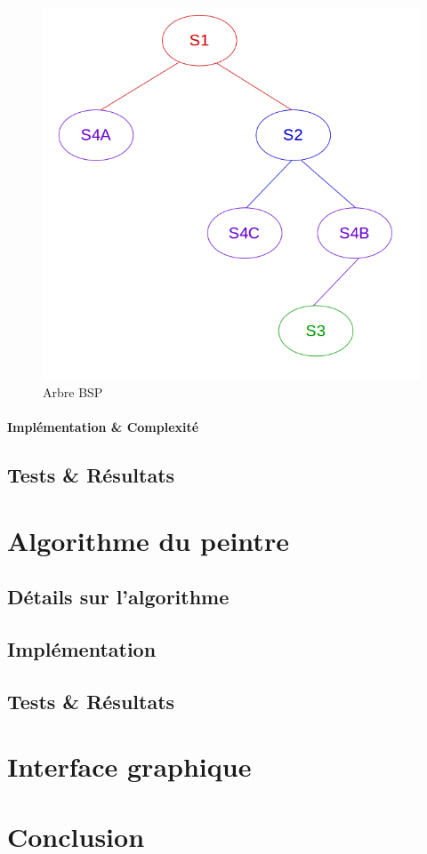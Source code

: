 \documentclass[11pt,a4paper]{article}
\begin{document}
\begin{figure}[!h]
\centering
\includegraphics[scale=0.4]{free_splits_3.png}
\caption{Arbre BSP}
\label{split_bsp}
\end{figure}

\paragraph{Implémentation \& Complexité}

\subsection{Tests \& Résultats}

\section{Algorithme du peintre}

\subsection{Détails sur l'algorithme}

\subsection{Implémentation}

\subsection{Tests \& Résultats}

\section{Interface graphique}


\section*{Conclusion}
\end{document}
